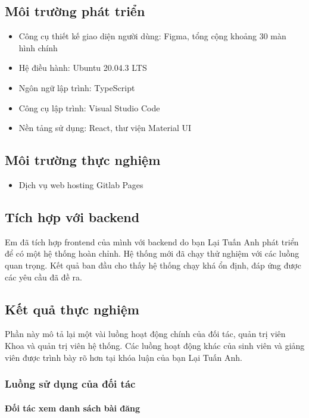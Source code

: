 \documentclass[./../main.tex]{subfiles}
\begin{document}
\subsection{Môi trường phát triển}

\begin{itemize}
	\item Công cụ thiết kế giao diện người dùng: Figma, tổng cộng khoảng 30 màn hình chính
	\item Hệ điều hành: Ubuntu 20.04.3 LTS
	\item Ngôn ngữ lập trình: TypeScript
	\item Công cụ lập trình: Visual Studio Code
	\item Nền tảng sử dụng: React, thư viện Material UI
\end{itemize}

\subsection{Môi trường thực nghiệm}

\begin{itemize}
	\item Dịch vụ web hosting Gitlab Pages
\end{itemize}

\subsection{Tích hợp với backend}
Em đã tích hợp frontend của mình với backend do bạn Lại Tuấn Anh phát triển để có một hệ thống hoàn chỉnh. Hệ thống mới đã chạy thử nghiệm với các luồng quan trọng. Kết quả ban đầu cho thấy hệ thống chạy khá ổn định, đáp ứng được các yêu cầu đã đề ra.

\subsection{Kết quả thực nghiệm}

Phần này mô tả lại một vài luồng hoạt động chính của đối tác, quản trị viên Khoa và quản trị viên hệ thống. Các luồng hoạt động khác của sinh viên và giảng viên được trình bày rõ hơn tại khóa luận của bạn Lại Tuấn Anh.

\subsubsection{Luồng sử dụng của đối tác}

\paragraph*{Đối tác xem danh sách bài đăng}
\end{document}
